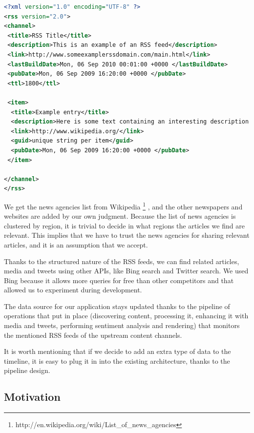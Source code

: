 \documentclass{acm_proc_10ptArticle-sp}
\begin{document}
\begin{minipage}{\linewidth}
\begin{lstlisting}[language=XML, frame=single, caption=Example RSS feed, breaklines=true, captionpos=b]
<?xml version="1.0" encoding="UTF-8" ?>
<rss version="2.0">
<channel>
 <title>RSS Title</title>
 <description>This is an example of an RSS feed</description>
 <link>http://www.someexamplerssdomain.com/main.html</link>
 <lastBuildDate>Mon, 06 Sep 2010 00:01:00 +0000 </lastBuildDate>
 <pubDate>Mon, 06 Sep 2009 16:20:00 +0000 </pubDate>
 <ttl>1800</ttl>
 
 <item>
  <title>Example entry</title>
  <description>Here is some text containing an interesting description.</description>
  <link>http://www.wikipedia.org/</link>
  <guid>unique string per item</guid>
  <pubDate>Mon, 06 Sep 2009 16:20:00 +0000 </pubDate>
 </item>
 
</channel>
</rss>
\end{lstlisting}
\end{minipage}

We get the news agencies list from Wikipedia \footnote{http://en.wikipedia.org/wiki/List\_of\_news\_agencies}
, and the other newspapers and websites are added by our own judgment. Because the list of news agencies is clustered by region, it is trivial to decide in what regions the articles we find are relevant. This implies that we have to trust the news agencies for sharing relevant articles, and it is an assumption that we accept.

Thanks to the structured nature of the RSS feeds, we can find related articles, media and tweets using other APIs, like Bing search and Twitter search. We used Bing because it allows more queries for free than other competitors and that allowed us to experiment during development.

The data source for our application stays updated thanks to the pipeline of operations that put in place (discovering content, processing it, enhancing it with media and tweets, performing sentiment analysis and rendering) that monitors the mentioned RSS feeds of the upstream content channels.

It is worth mentioning that if we decide to add an extra type of data to the timeline, it is easy to plug it in into the existing architecture, thanks to the pipeline design.

\subsection{Motivation}
\end{document}
